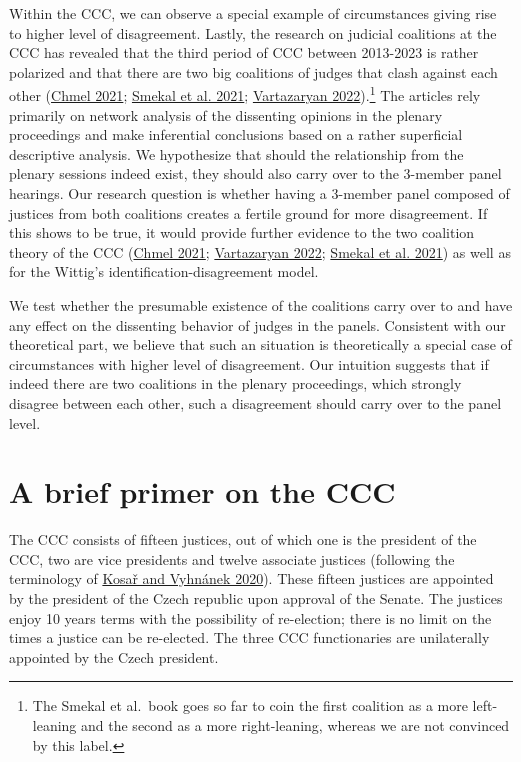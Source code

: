 \documentclass[
  11pt,
]{article}
\begin{document}
Within the CCC, we can observe a special example of circumstances giving
rise to higher level of disagreement. Lastly, the research on judicial
coalitions at the CCC has revealed that the third period of CCC between
2013-2023 is rather polarized and that there are two big coalitions of
judges that clash against each other
(\protect\hyperlink{ref-chmelCoOvlivnujeUstavni2021}{Chmel 2021};
\protect\hyperlink{ref-smekalMimopravniVlivyNa2021}{Smekal et al. 2021};
\protect\hyperlink{ref-vartazaryanSitOvaAnalyza2022}{Vartazaryan
2022}).\footnote{The Smekal et al.~book goes so far to coin the first
  coalition as a more left-leaning and the second as a more
  right-leaning, whereas we are not convinced by this label.} The
articles rely primarily on network analysis of the dissenting opinions
in the plenary proceedings and make inferential conclusions based on a
rather superficial descriptive analysis. We hypothesize that should the
relationship from the plenary sessions indeed exist, they should also
carry over to the 3-member panel hearings. Our research question is
whether having a 3-member panel composed of justices from both
coalitions creates a fertile ground for more disagreement. If this shows
to be true, it would provide further evidence to the two coalition
theory of the CCC
(\protect\hyperlink{ref-chmelCoOvlivnujeUstavni2021}{Chmel 2021};
\protect\hyperlink{ref-vartazaryanSitOvaAnalyza2022}{Vartazaryan 2022};
\protect\hyperlink{ref-smekalMimopravniVlivyNa2021}{Smekal et al. 2021})
as well as for the Wittig's identification-disagreement model.

We test whether the presumable existence of the coalitions carry over to
and have any effect on the dissenting behavior of judges in the panels.
Consistent with our theoretical part, we believe that such an situation
is theoretically a special case of circumstances with higher level of
disagreement. Our intuition suggests that if indeed there are two
coalitions in the plenary proceedings, which strongly disagree between
each other, such a disagreement should carry over to the panel level.

\hypertarget{a-brief-primer-on-the-ccc}{%
\section{A brief primer on the CCC}\label{a-brief-primer-on-the-ccc}}

The CCC consists of fifteen justices, out of which one is the president
of the CCC, two are vice presidents and twelve associate justices
(following the terminology of
\protect\hyperlink{ref-kosarConstitutionalCourtCzechia2020}{Kosař and
Vyhnánek 2020}). These fifteen justices are appointed by the president
of the Czech republic upon approval of the Senate. The justices enjoy 10
years terms with the possibility of re-election; there is no limit on
the times a justice can be re-elected. The three CCC functionaries are
unilaterally appointed by the Czech president.
\end{document}

